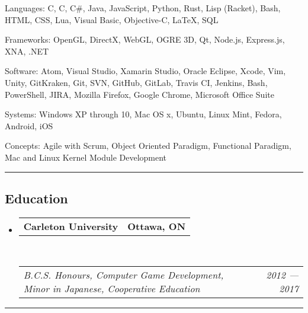 \documentclass[10pt,letterpaper]{article}
\makeatletter
\newenvironment{indentsection}[1]%
{\begin{list}{}%
  {\setlength{\leftmargin}{#1}}%
  \item[]%
}
{\end{list}}
\newcommand{\headerrow}[2]
{\begin{tabular*}{\linewidth}{l@{\extracolsep{\fill}}r}
  #1 &
  #2 \\
\end{tabular*}}
\newcommand{\CPP}
{C\nolinebreak[4]\hspace{-.05em}\raisebox{.22ex}{\footnotesize\bf ++}}
\makeatother
\begin{document}
\begin{indentsection}{\parindent}
\begin{description*}
  \item[Languages:]
  C, \CPP, C\#, Java, JavaScript, Python, Rust, Lisp (Racket), Bash, HTML, CSS,
  Lua, Visual Basic, Objective-C, \LaTeX, SQL
  \\
  \item[Frameworks:]
  OpenGL, DirectX, WebGL, OGRE 3D, Qt, Node.js, Express.js, XNA, .NET
  \\
  \item[Software:]
  Atom, Visual Studio, Xamarin Studio, Oracle Eclipse, Xcode, Vim, Unity,
  GitKraken, Git, SVN, GitHub, GitLab, Travis CI, Jenkins, Bash, PowerShell,
  JIRA, Mozilla Firefox, Google Chrome, Microsoft Office Suite
  \\
  \item[Systems:]
  Windows XP through 10, Mac OS x, Ubuntu, Linux Mint, Fedora, Android, iOS
  \\
  \item[Concepts:]
  Agile with Scrum, Object Oriented Paradigm, Functional Paradigm, Mac and Linux
  Kernel Module Development
\end{description*}
\end{indentsection}

\hrule
\vspace{-0.4em}
\subsection*{Education}

\begin{itemize}
  \parskip=0.1em

  \item
  \headerrow
    {\textbf{Carleton University}}
    {\textbf{Ottawa, ON}}
  \\
  \headerrow
    {\emph{B.C.S. Honours, Computer Game Development, Minor in Japanese,
           Cooperative Education}}
    {\emph{2012 — 2017}}

\end{itemize}

\hrule
\vspace{-0.4em}
\end{document}
